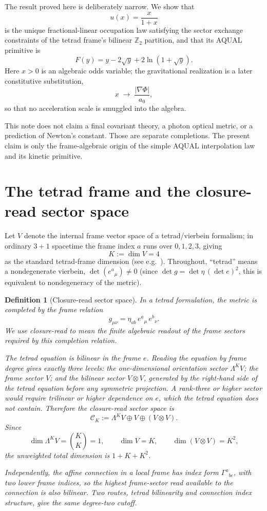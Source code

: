 \documentclass[10pt]{article}
\newtheorem{definition}{Definition}
\begin{document}
The result proved here is deliberately narrow. We show that
\[
        u(x)=\frac{x}{1+x}
\]
is the unique fractional-linear occupation law satisfying the sector exchange
constraints of the tetrad frame's bilinear $\mathbb Z_2$ partition, and that
its AQUAL primitive is
\[
        F(y)=y-2\sqrt y+2\ln(1+\sqrt y).
\]
Here $x>0$ is an algebraic odds variable; the gravitational realization
is a later constitutive substitution,
\[
        x\;\longrightarrow\;\frac{|\nabla\Phi|}{a_0},
\]
so that no acceleration scale is smuggled into the algebra.

This note does not claim a final covariant theory, a photon optical metric, or a
prediction of Newton's constant. Those are separate completions. The present
claim is only the frame-algebraic origin of the simple AQUAL interpolation law
and its kinetic primitive.

\section{The tetrad frame and the closure-read sector space}
Let $V$ denote the internal frame vector space of a tetrad/vierbein formalism;
in ordinary $3+1$ spacetime the frame index $a$ runs over $0,1,2,3$, giving
\[
        K:=\dim V=4
\]
as the standard tetrad-frame dimension (see e.g.\ \cite{Wald1984,Hehl1976}).
Throughout, ``tetrad'' means a nondegenerate vierbein,
$\det(e^a{}_\mu)\neq 0$ (since
$\det g=\det\eta\,(\det e)^2$, this is equivalent to nondegeneracy of the metric).

\begin{definition}[Closure-read sector space]
In a tetrad formulation, the metric is completed by the frame relation
\[
        g_{\mu\nu}=\eta_{ab}\,e^a{}_\mu\,e^b{}_\nu.
\]
We use \emph{closure-read} to mean the finite algebraic readout of the frame
sectors required by this completion relation.

The tetrad equation is bilinear in the frame $e$.  Reading the equation by
frame degree gives exactly three levels: the one-dimensional orientation
sector $\Lambda^K V$; the frame sector $V$; and the bilinear sector
$V\otimes V$, generated by the right-hand side of the tetrad equation
before any symmetric projection.
A rank-three or higher sector would require trilinear or higher dependence
on $e$, which the tetrad equation does not contain.  Therefore the
closure-read sector space is
\[
        \mathcal C_K:=\Lambda^K V\oplus V\oplus (V\otimes V).
\]
Since
\[
        \dim\Lambda^K V=\binom{K}{K}=1,
        \qquad
        \dim V=K,
        \qquad
        \dim(V\otimes V)=K^2,
\]
the unweighted total dimension is $1+K+K^2$.

Independently, the affine connection in a local frame has index form
$\Gamma^a{}_{bc}$, with two lower frame indices, so the highest
frame-sector read available to the connection is also bilinear.  Two
routes, tetrad bilinearity and connection index structure, give the same
degree-two cutoff.
\end{definition}
\end{document}
